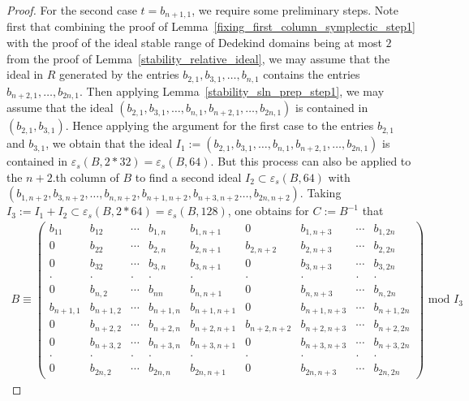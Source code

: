 \documentclass[12pt]{amsart}
\theoremstyle{definition}\newtheorem{definition}[theorem]{Definition}
\theoremstyle{remark}\newtheorem{remark}[theorem]{Remark}
\theoremstyle{definition}\newtheorem{case}{Case}
\begin{document}
\begin{proof}
For the second case $t=b_{n+1,1}$, we require some preliminary steps. Note first that combining the proof of Lemma~\ref{fixing_first_column_symplectic_step1} with the proof of the ideal stable range of Dedekind domains being at most $2$ from the proof of Lemma~\ref{stability_relative_ideal}, we may assume that the ideal in $R$ generated by the entries $b_{2,1},b_{3,1},\dots,b_{n,1}$ contains the entries $b_{n+2,1},\dots,b_{2n,1}.$ Then applying Lemma~\ref{stability_sln_prep_step1}, we may assume that the ideal $(b_{2,1},b_{3,1},\dots,b_{n,1},b_{n+2,1},\dots,b_{2n,1})$ is contained in $(b_{2,1},b_{3,1}).$ Hence applying the argument for the first case to the entries $b_{2,1}$ and $b_{3,1}$, we obtain that the ideal $I_1:=(b_{2,1},b_{3,1},\dots,b_{n,1},b_{n+2,1},\dots,b_{2n,1})$ is contained in $\varepsilon_s(B,2*32)=\varepsilon_s(B,64).$ But this process can also be applied to the $n+2.$th column of $B$ to find a second ideal $I_2\subset\varepsilon_s(B,64)$ with $(b_{1,n+2},b_{3,n+2},\dots,b_{n,n+2},b_{n+1,n+2},b_{n+3,n+2}\dots,b_{2n,n+2}).$ Taking $I_3:=I_1+I_2\subset\varepsilon_s(B,2*64)=\varepsilon_s(B,128)$, one obtains for $C:=B^{-1}$ that
\begin{align*}
B\equiv
\begin{pmatrix}
b_{11} & b_{12} & \cdots & b_{1,n} & b_{1,n+1} & 0 & b_{1,n+3} & \cdots & b_{1,2n}\\
0 & b_{22} & \cdots & b_{2,n} & b_{2,n+1} & b_{2,n+2} & b_{2,n+3} & \cdots & b_{2,2n}\\
0 & b_{32} & \cdots & b_{3,n} & b_{3,n+1} & 0 & b_{3,n+3} & \cdots & b_{3,2n}\\
\cdot & \cdot & \cdot & \cdot & \cdot & \cdot & \cdot & \cdot & \cdot\\
0 & b_{n,2} & \cdots & b_{nn} & b_{n,n+1} & 0 & b_{n,n+3} & \cdots & b_{n,2n}\\
b_{n+1,1} & b_{n+1,2} & \cdots & b_{n+1,n} & b_{n+1,n+1} & 0 & b_{n+1,n+3} & \cdots & b_{n+1,2n}\\
0 & b_{n+2,2} & \cdots & b_{n+2,n} & b_{n+2,n+1} & b_{n+2,n+2} & b_{n+2,n+3} & \cdots & b_{n+2,2n}\\
0 & b_{n+3,2} & \cdots & b_{n+3,n} & b_{n+3,n+1} & 0 & b_{n+3,n+3} & \cdots & b_{n+3,2n}\\
\cdot & \cdot & \cdot & \cdot & \cdot & \cdot & \cdot & \cdot & \cdot\\
0 & b_{2n,2} & \cdots & b_{2n,n} & b_{2n,n+1} & 0 & b_{2n,n+3} & \cdots & b_{2n,2n}
\end{pmatrix}\text{ mod }I_3
\end{align*}

\end{proof}
\end{document}
